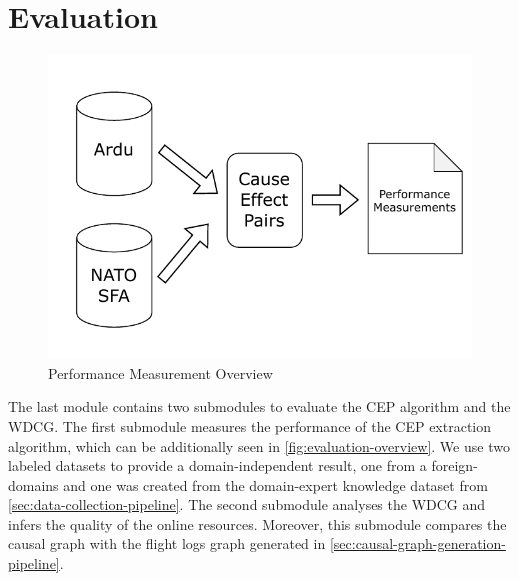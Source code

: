 \section{Evaluation}\label{sec:evaluation-pipeline}
\begin{figure}
    \begin{center}
        \includegraphics[scale=.7]{figures/pipeline_overview/evalutation_overview}
        \caption{Performance Measurement Overview}\label{fig:evaluation-overview}
    \end{center}
\end{figure}
The last module contains two submodules to evaluate the \ac{CEP} algorithm and the \ac{WDCG}.
The first submodule measures the performance of the \ac{CEP} extraction algorithm, which can be additionally seen in \autoref{fig:evaluation-overview}.
We use two labeled datasets to provide a domain-independent result, one from a foreign-domains and one was created from the domain-expert knowledge dataset from \autoref{sec:data-collection-pipeline}.
The second submodule analyses the \ac{WDCG} and infers the quality of the online resources.
Moreover, this submodule compares the causal graph with the flight logs graph generated in \autoref{sec:causal-graph-generation-pipeline}.
